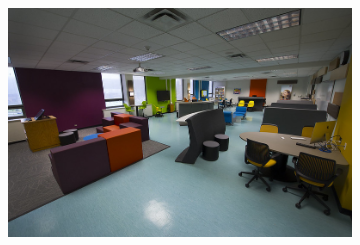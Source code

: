 \begin{figure}
\centering
\begin{subfigure}{.75\textwidth}
\centering
\includegraphics[width=\textwidth]{photo.jpg} \\


\end{subfigure}
\end{figure}
